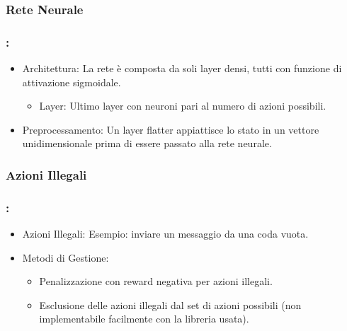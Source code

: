 \documentclass[compress]{beamer}
\begin{document}
\subsubsection*{Rete Neurale}
\begin{frame}
    \frametitle{\subsecname: \subsubsecname}
    \begin{itemize}
        \item Architettura: La rete è composta da soli layer densi, tutti con funzione di attivazione sigmoidale.
        \begin{itemize}
            \item Layer: Ultimo layer con neuroni pari al numero di azioni possibili.
        \end{itemize}
        \item Preprocessamento: Un layer flatter appiattisce lo stato in un vettore unidimensionale prima di essere passato alla rete neurale.
    \end{itemize}
\end{frame}

\subsubsection*{Azioni Illegali}
\begin{frame}
    \frametitle{\subsecname: \subsubsecname}
    \begin{itemize}
        \item Azioni Illegali: Esempio: inviare un messaggio da una coda vuota.
        \item Metodi di Gestione:
        \begin{itemize}
            \item Penalizzazione con reward negativa per azioni illegali.
            \item Esclusione delle azioni illegali dal set di azioni possibili (non implementabile facilmente con la libreria usata).
        \end{itemize}
    \end{itemize}
    \end{frame}
\end{document}
